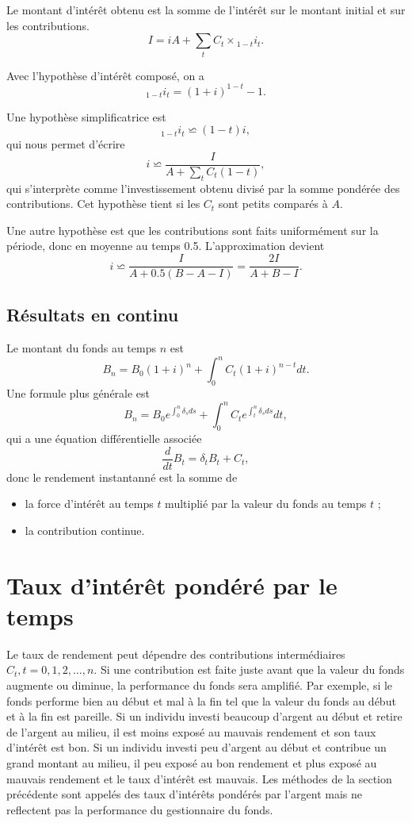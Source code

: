 Le montant d'intérêt obtenu est la somme de l'intérêt sur le montant initial et sur les contributions. 
$$I = iA + \sum_{t}C_t \times {}_{1-t}i_t.$$

Avec l'hypothèse d'intérêt composé, on a 
$${}_{1-t}i_t = (1 + i)^{1-t}-1.$$

Une hypothèse simplificatrice est 
$${}_{1-t}i_t \backsimeq (1-t)i,$$
qui nous permet d'écrire
$$i \backsimeq \frac{I}{A + \sum_t C_t(1-t)},$$
qui s'interprète comme l'investissement obtenu divisé par la somme pondérée des contributions. Cet hypothèse tient si les $C_t$ sont petits comparés à $A$. 

Une autre hypothèse est que les contributions sont faits uniformément sur la période, donc en moyenne au temps 0.5. L'approximation devient
$$i \backsimeq \frac{I}{A + 0.5(B-A-I)} = \frac{2I}{A+B-I}.$$

\subsection{Résultats en continu}

Le montant du fonds au temps $n$ est 
$$B_n = B_0(1 + i)^n + \int_{0}^{n} C_t(1 + i)^{n-t}dt.$$
Une formule plus générale est 
$$B_n = B_0 e^{\int_{0}^{n}\delta_s ds} + \int_{0}^{n}C_t e^{\int_{t}^{n}\delta_s ds} dt,$$
qui a une équation différentielle associée 
$$\frac{d}{dt}B_t = \delta_t B_t + C_t,$$
donc le rendement instantanné est la somme de 
\begin{itemize}
	\item la force d'intérêt au temps $t$ multiplié par la valeur du fonds au temps $t$ ; 
	\item la contribution continue. 
\end{itemize}

\section{Taux d'intérêt pondéré par le temps}

Le taux de rendement peut dépendre des contributions intermédiaires $C_t, t = 0, 1, 2, \dots, n$. Si une contribution est faite juste avant que la valeur du fonds augmente ou diminue, la performance du fonds sera amplifié. Par exemple, si le fonds performe bien au début et mal à la fin tel que la valeur du fonds au début et à la fin est pareille. Si un individu investi beaucoup d'argent au début et retire de l'argent au milieu, il est moins exposé au mauvais rendement et son taux d'intérêt est bon. Si un individu investi peu d'argent au début et contribue un grand montant au milieu, il peu exposé au bon rendement et plus exposé au mauvais rendement et le taux d'intérêt est mauvais. Les méthodes de la section précédente sont appelés des taux d'intérêts pondérés par l'argent mais ne reflectent pas la performance du gestionnaire du fonds. 

